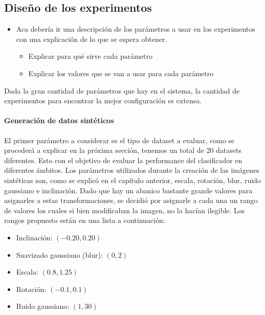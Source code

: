 \subsection{Diseño de los experimentos}

	\begin{itemize}
		\item Aca debería ir una descripción de los parámetros a usar en los experimentos con una explicación de lo que se espera obtener.
		\begin{itemize}
			\item Explicar para qué sirve cada parámetro
			\item Explicar los valores que se van a usar para cada parámetro
		\end{itemize}
	\end{itemize}

	Dada la gran cantidad de parámetros que hay en el sistema, la cantidad de experimentos para encontrar la mejor configuración es extensa.


        \paragraph{Generación de datos sintéticos}

	El primer parámetro a considerar es el tipo de dataset a evaluar, como se procederá a explicar en la próxima sección, tenemos un total de 20 datasets diferentes. Esto con el objetivo de evaluar la performance del clasificador en diferentes ámbitos. Los parámetros utilizados durante la creación de las imágenes sintéticas son, como se explicó en el capítulo anterior, escala, rotación, blur, ruido gaussiano e inclinación. Dado que hay un abanico bastante grande valores para asignarles a estas transformaciones, se decidió por asignarle a cada una un rango de valores los cuales si bien modificaban la imagen, no la hacían ilegible. Los rangos propuesto están en una lista a continuación:
	\begin{itemize}
		\item Inclinación: $(-0.20, 0.20)$
		\item Suavizado gaussiano (blur): $(0, 2)$
		\item Escala: $(0.8, 1.25)$
		\item Rotación: $(-0.1, 0.1)$
		\item Ruido gaussiano: $(1, 30)$
	\end{itemize}

